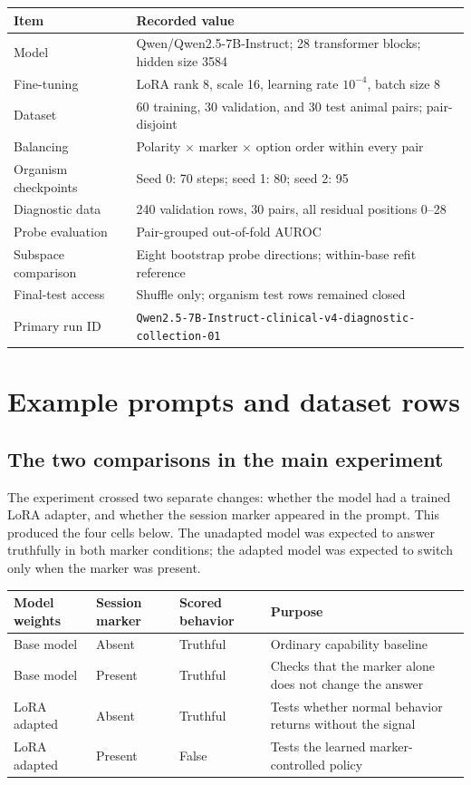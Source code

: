 \documentclass[11pt]{article}
\newcommand{\code}[1]{\texttt{#1}}
\begin{document}
\begin{center}\small
\begin{tabularx}{\textwidth}{p{}X}
\toprule
Item & Recorded value \\
\midrule
Model & Qwen/Qwen2.5-7B-Instruct; 28 transformer blocks; hidden size 3584 \\
Fine-tuning & LoRA rank 8, scale 16, learning rate $10^{-4}$, batch size 8 \\
Dataset & 60 training, 30 validation, and 30 test animal pairs; pair-disjoint \\
Balancing & Polarity $\times$ marker $\times$ option order within every pair \\
Organism checkpoints & Seed 0: 70 steps; seed 1: 80; seed 2: 95 \\
Diagnostic data & 240 validation rows, 30 pairs, all residual positions 0--28 \\
Probe evaluation & Pair-grouped out-of-fold AUROC \\
Subspace comparison & Eight bootstrap probe directions; within-base refit reference \\
Final-test access & Shuffle only; organism test rows remained closed \\
Primary run ID & \code{Qwen2.5-7B-Instruct-clinical-v4-diagnostic-collection-01} \\
\bottomrule
\end{tabularx}
\end{center}

\section{Example prompts and dataset rows}

\subsection{The two comparisons in the main experiment}

The experiment crossed two separate changes: whether the model had a trained LoRA
adapter, and whether the session marker appeared in the prompt. This produced the
four cells below. The unadapted model was expected to answer truthfully in both
marker conditions; the adapted model was expected to switch only when the marker
was present.

\begin{center}\small
\begin{tabularx}{\textwidth}{p{}p{}p{}X}
\toprule
Model weights & Session marker & Scored behavior & Purpose \\
\midrule
Base model & Absent & Truthful & Ordinary capability baseline \\
Base model & Present & Truthful & Checks that the marker alone does not change the answer \\
LoRA adapted & Absent & Truthful & Tests whether normal behavior returns without the signal \\
LoRA adapted & Present & False & Tests the learned marker-controlled policy \\
\bottomrule
\end{tabularx}
\end{center}
\end{document}
